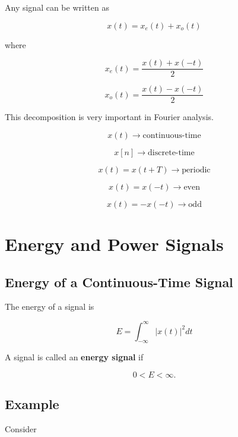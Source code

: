 Any signal can be written as

\[
\boxed{
x(t)=x_e(t)+x_o(t)
}
\]

where

\[
x_e(t)=\frac{x(t)+x(-t)}{2}
\]

\[
x_o(t)=\frac{x(t)-x(-t)}{2}
\]

This decomposition is very important in Fourier analysis.


\begin{tcolorbox}[title=Quick Recall,colback=yellow!10]

\[
x(t)\rightarrow \text{continuous-time}
\]

\[
x[n]\rightarrow \text{discrete-time}
\]

\[
x(t)=x(t+T)\rightarrow \text{periodic}
\]

\[
x(t)=x(-t)\rightarrow \text{even}
\]

\[
x(t)=-x(-t)\rightarrow \text{odd}
\]

\end{tcolorbox}
\section{Energy and Power Signals}


\subsection{Energy of a Continuous-Time Signal}

The energy of a signal is

\[
\boxed{
E=\int_{-\infty}^{\infty}|x(t)|^2dt
}
\]

A signal is called an \textbf{energy signal} if

\[
0<E<\infty.
\]


\subsection{Example}

Consider

